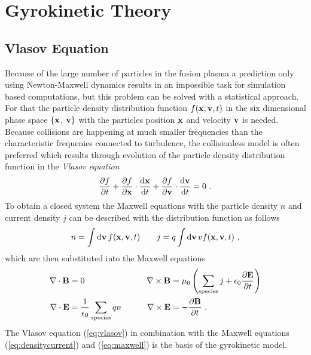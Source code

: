 \newpage
\section{Gyrokinetic Theory}
\label{sec:gyrokinetic}

\subsection{Vlasov Equation}
\label{sub:vlasov}

Because of the large number of particles in the fusion plasma a prediction only using Newton-Maxwell dynamics results in an impossible task for simulation based computations, but this problem can be solved with a statistical approach. For that the particle density distribution function $f(\boldsymbol{\mathbf{x}}, \boldsymbol{\mathbf{v}}, t)$ in the six dimensional phase space $\{\boldsymbol{\mathbf{x}}$, $\boldsymbol{\mathbf{v}}\}$ with the particles position $\boldsymbol{\mathbf{x}}$ and velocity $\boldsymbol{\mathbf{v}}$ is needed. Because collisions are happening at much smaller frequencies than the characteristic frequenies connected to turbulence, the collisionless model is often preferred \cite{Garbet2010} which results through evolution of the particle density distribution function in the \textit{Vlasov equation}
\begin{gather}
	\frac{\partial f}{\partial t} + \frac{\partial f}{\partial \boldsymbol{\mathbf{x}}} \cdot \frac{\mathrm{d}\boldsymbol{\mathbf{x}}}{\mathrm{d}t} + \frac{\partial f}{\partial \boldsymbol{\mathbf{v}}} \cdot \frac{\mathrm{d}\boldsymbol{\mathbf{v}}}{\mathrm{d}t} = 0~.
	\label{eq:vlasov}
\end{gather}
To obtain a closed system the Maxwell equations with the particle density $n$ and current density $j$ can be described with the distribution function as follows
\begin{gather}
	n = \int \mathrm{d}\boldsymbol{\mathbf{v}}\,f(\boldsymbol{\mathbf{x}}, \boldsymbol{\mathbf{v}}, t) \qquad j = q \int \mathrm{d}\boldsymbol{\mathbf{v}}\, v f(\boldsymbol{\mathbf{x}}, \boldsymbol{\mathbf{v}}, t)~,
	\label{eq:densitycurrent}
\end{gather}
which are then substituted into the Maxwell equations
\begin{gather}
	\begin{aligned}
		\nabla \cdot \boldsymbol{\mathbf{B}} &= 0 &\qquad \nabla \times \boldsymbol{\mathbf{B}} &= \mu_0\left( \sum_\mathrm{species} j + \epsilon_0 \frac{\partial \boldsymbol{\mathbf{E}}}{\partial t} \right) \\
		\nabla \cdot \boldsymbol{\mathbf{E}} &= \frac{1}{\epsilon_0} \sum_\mathrm{species} qn &\qquad \nabla \times \boldsymbol{\mathbf{E}} &= - \frac{\partial \boldsymbol{\mathbf{B}}}{\partial t}~.
	\end{aligned}
	\label{eq:maxwell}
\end{gather}
The Vlasov equation (\ref{eq:vlasov}) in combination with the Maxwell equations (\ref{eq:densitycurrent}) and (\ref{eq:maxwell}) is the basis of the gyrokinetic model. \cite{Krommes2012}

